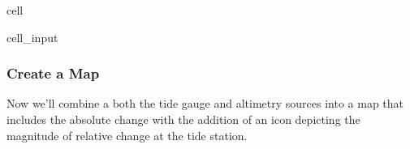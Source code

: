 \documentclass[letterpaper,10pt,english]{jupyterBook}
\begin{document}
\begin{sphinxuseclass}{cell}\begin{sphinxVerbatimInput}

\begin{sphinxuseclass}{cell_input}
\begin{sphinxVerbatim}[commandchars=\\\{\}]
    

  
  
\end{sphinxVerbatim}

\end{sphinxuseclass}\end{sphinxVerbatimInput}

\end{sphinxuseclass}

\subsubsection{Create a Map}
\label{\detokenize{notebooks/regional_and_local/SL_Trend:create-a-map}}\label{\detokenize{notebooks/regional_and_local/SL_Trend:id4}}
\sphinxAtStartPar
Now we’ll combine a both the tide gauge and altimetry sources into a map that includes the absolute change with the addition of an icon depicting the magnitude of relative change at the tide station.
\end{document}
